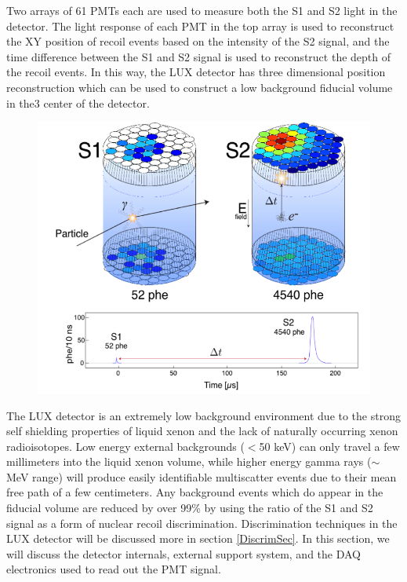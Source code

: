 \documentclass[a4paper,12pt]{article}
\begin{document}
Two arrays of 61 PMTs each are used to measure both the S1 and S2 light in the detector.  The light response of each PMT in the top array is used to reconstruct the XY position of recoil events based on the intensity of the S2 signal, and the time difference between the S1 and S2 signal is used to reconstruct the depth of the recoil events.  In this way, the LUX detector has three dimensional position reconstruction which can be used to construct a low background fiducial volume in the3 center of the detector.  

 \begin{figure} 
\includegraphics[scale=.5]{LUXevent.png} 
\label{LUXevent}
\end{figure}

The LUX detector is an extremely low background environment due to the strong self shielding properties of liquid xenon and the lack of naturally occurring xenon radioisotopes.  Low energy external backgrounds ($<$50 keV) can only travel a few millimeters into the liquid xenon volume, while higher energy gamma rays ($\sim$MeV range) will produce easily identifiable multiscatter events due to their mean free path of a few centimeters.  Any background events which do appear in the fiducial volume are reduced by over 99\% by using the ratio of the S1 and S2 signal as a form of nuclear recoil discrimination.  Discrimination techniques in the LUX detector will be discussed more in section \ref{DiscrimSec}.  In this section, we will  discuss the detector internals, external support system, and the DAQ electronics used to read out the PMT signal.  
\end{document}
